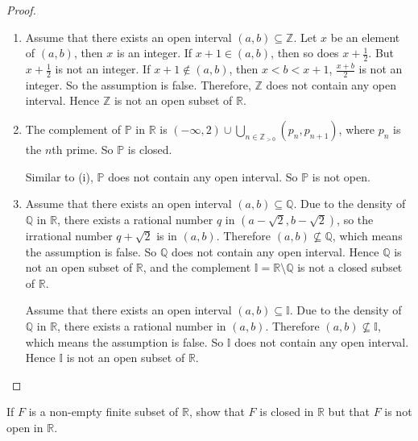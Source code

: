 \begin{proof}
    \begin{enumerate}[label={(\roman*)}]
        \item Assume that there exists an open interval $(a, b)\subseteq \mathbb{Z}$. Let $x$ be an element of $(a, b)$, then $x$ is an integer. If $x+1\in (a, b)$, then so does $x+\frac{1}{2}$. But $x+\frac{1}{2}$ is not an integer. If $x+1\notin (a, b)$, then $x < b < x+1$, $\frac{x+b}{2}$ is not an integer. So the assumption is false. Therefore, $\mathbb{Z}$ does not contain any open interval. Hence $\mathbb{Z}$ is not an open subset of $\mathbb{R}$.
        \item The complement of $\mathbb{P}$ in $\mathbb{R}$ is $(-\infty, 2)\cup\bigcup_{n\in\mathbb{Z}_{>0}} (p_{n}, p_{n+1})$, where $p_{n}$ is the $n$th prime. So $\mathbb{P}$ is closed.

              Similar to (i), $\mathbb{P}$ does not contain any open interval. So $\mathbb{P}$ is not open.
        \item Assume that there exists an open interval $(a, b)\subseteq \mathbb{Q}$. Due to the density of $\mathbb{Q}$ in $\mathbb{R}$, there exists a rational number $q$ in $(a - \sqrt{2}, b - \sqrt{2})$, so the irrational number $q + \sqrt{2}$ is in $(a, b)$. Therefore $(a, b)\nsubseteq \mathbb{Q}$, which means the assumption is false. So $\mathbb{Q}$ does not contain any open interval. Hence $\mathbb{Q}$ is not an open subset of $\mathbb{R}$, and the complement $\mathbb{I} = \mathbb{R}\setminus\mathbb{Q}$ is not a closed subset of $\mathbb{R}$.

              Assume that there exists an open interval $(a, b)\subseteq \mathbb{I}$. Due to the density of $\mathbb{Q}$ in $\mathbb{R}$, there exists a rational number in $(a, b)$. Therefore $(a, b)\nsubseteq \mathbb{I}$, which means the assumption is false. So $\mathbb{I}$ does not contain any open interval. Hence $\mathbb{I}$ is not an open subset of $\mathbb{R}$.
    \end{enumerate}
\end{proof}
\newpage

\begin{exercise}
    If $F$ is a non-empty finite subset of $\mathbb{R}$, show that $F$ is closed in $\mathbb{R}$ but that $F$ is not open in $\mathbb{R}$.
\end{exercise}

